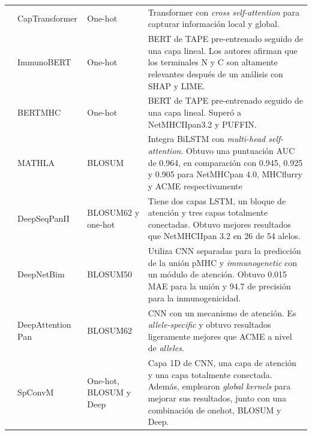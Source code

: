 \begin{table}[h]
{\begin{scriptsize}
\begin{tabular}{p{2.5cm}p{2.5cm}p{2cm}p{5.5cm}}
			\cite{chen2021jointly}  & CapTransformer            & One-hot   &  Transformer con \textit{cross self-attention} para capturar información local y global.  \\
			
			\cite{gasser2021interpreting}  & ImmunoBERT            & One-hot                     & BERT de TAPE pre-entrenado seguido de una capa lineal. Los autores afirman que los terminales N y C son altamente relevantes después de un análisis con SHAP y LIME.   \\
			
			\cite{cheng2021bertmhc}             & BERTMHC              & One-hot                    & BERT de TAPE pre-entrenado seguido de una capa lineal. Superó a NetMHCIIpan3.2 y PUFFIN.   \\
			
			\cite{ye2021mathla}         & MATHLA             & BLOSUM                      & 
			Integra BiLSTM con \textit{multi-head self-attention}. Obtuvo una puntuación AUC de 0.964, en comparación con 0.945, 0.925 y 0.905 para NetMHCpan 4.0, MHCflurry y ACME respectivamente  \\
			
			\cite{liu2021deepseqpanii}                    & DeepSeqPanII                            & BLOSUM62 y one-hot& Tiene dos capas LSTM, un bloque de atención y tres capas totalmente conectadas. Obtuvo mejores resultados que NetMHCIIpan 3.2 en 26 de 54 alelos.       \\
			
			\cite{yang2021deepnetbim}  & DeepNetBim               & BLOSUM50            & Utiliza CNN separadas para la predicción de la unión pMHC y \textit{immunogenetic} con un módulo de atención. Obtuvo 0.015 MAE para la unión y 94.7 de precisión para la inmunogenicidad.      \\
			
			\cite{jin2021deep}         & DeepAttention Pan        & BLOSUM62            & CNN con un mecanismo de atención. Es \textit{allele-specific} y obtuvo resultados ligeramente mejores que ACME a nivel de \textit{alleles}.     \\
			
			\cite{chen2021ranking}  & SpConvM            &  One-hot, BLOSUM y Deep                     &  Capa 1D de CNN, una capa de atención y una capa totalmente conectada. Además, emplearon \textit{global kernels} para mejorar sus resultados, junto con una combinación de onehot, BLOSUM y Deep.  \\
			

\end{tabular}
\end{scriptsize}}
\end{table}

